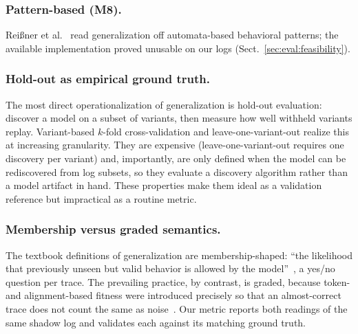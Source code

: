 \documentclass[runningheads]{llncs}
\begin{document}
\subsubsection{Pattern-based (M8).}
Rei{\ss}ner et al.~\cite{reissner2020pattern} read generalization off automata-based behavioral patterns; the available implementation proved unusable on our logs (Sect.~\ref{sec:eval:feasibility}).

\subsubsection{Hold-out as empirical ground truth.}
The most direct operationalization of generalization is hold-out evaluation: discover a model on a subset of variants, then measure how well withheld variants replay. Variant-based $k$-fold cross-validation and leave-one-variant-out realize this at increasing granularity. They are expensive (leave-one-variant-out requires one discovery per variant) and, importantly, are only defined when the model can be rediscovered from log subsets, so they evaluate a discovery algorithm rather than a model artifact in hand. These properties make them ideal as a validation reference but impractical as a routine metric.

\subsubsection{Membership versus graded semantics.}
The textbook definitions of generalization are membership-shaped: ``the likelihood that previously unseen but valid behavior is allowed by the model''~\cite{vanderaalst2016pm}, a yes/no question per trace. The prevailing practice, by contrast, is graded, because token- and alignment-based fitness were introduced precisely so that an almost-correct trace does not count the same as noise~\cite{rozinat2008conformance}. Our metric reports both readings of the same shadow log and validates each against its matching ground truth.
\end{document}
